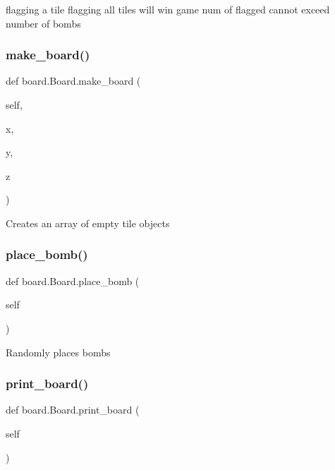 \begin{DoxyVerb}flagging a tile
    flagging all tiles will win game
    num of flagged cannot exceed number of bombs\end{DoxyVerb}
 \mbox{\label{classboard_1_1_board_ad8ae45ae3897296e325afbeb0ae8ae18}} 
\subsubsection{\texorpdfstring{make\+\_\+board()}{make\_board()}}
{\footnotesize\ttfamily def board.\+Board.\+make\+\_\+board (\begin{DoxyParamCaption}\item[{}]{self,  }\item[{}]{x,  }\item[{}]{y,  }\item[{}]{z }\end{DoxyParamCaption})}

\begin{DoxyVerb}Creates an array of empty tile objects\end{DoxyVerb}
 \mbox{\label{classboard_1_1_board_a80bb62a7dcf8e358084082ff6ea730e7}} 
\subsubsection{\texorpdfstring{place\+\_\+bomb()}{place\_bomb()}}
{\footnotesize\ttfamily def board.\+Board.\+place\+\_\+bomb (\begin{DoxyParamCaption}\item[{}]{self }\end{DoxyParamCaption})}

\begin{DoxyVerb}Randomly places bombs\end{DoxyVerb}
 \mbox{\label{classboard_1_1_board_aefc9d1d94c291d150c7cc4f171156238}} 
\subsubsection{\texorpdfstring{print\+\_\+board()}{print\_board()}}
{\footnotesize\ttfamily def board.\+Board.\+print\+\_\+board (\begin{DoxyParamCaption}\item[{}]{self }\end{DoxyParamCaption})}

